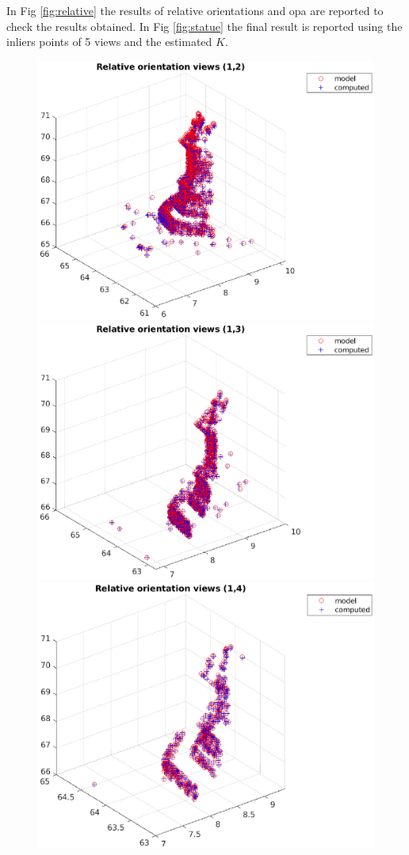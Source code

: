 \documentclass[11pt]{article}
\begin{document}
\bigskip
In Fig \ref{fig:relative} the results of relative orientations and opa are reported to check the results obtained. In Fig \ref{fig:statue} the final result is reported using the inliers points of 5 views and the estimated $K$.
\begin{figure}[H]
    \centering
    \includegraphics[scale=0.45]{images/relative_1.eps}
    \includegraphics[scale=0.45]{images/relative_2.eps}
    \qquad 
    \qquad
    \includegraphics[scale=0.45]{images/relative_3.eps}

\end{figure}
\end{document}
